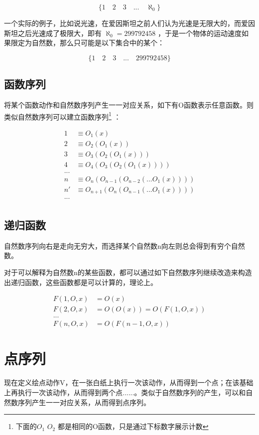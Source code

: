 \documentclass[12pt,oneside]{book}
\begin{document}
\[
\{1 \quad 2 \quad 3 \quad  ...  \quad \aleph_0\}
\]

一个实际的例子，比如说光速，在爱因斯坦之前人们认为光速是无限大的，而爱因斯坦之后光速成了极限大，即有 $\aleph_0=299792458$ ，于是一个物体的运动速度如果限定为自然数，那么只可能是以下集合中的某个：

\[
\{1 \quad 2 \quad 3 \quad  ...  \quad 299792458\}
\]

\subsection{函数序列}
将某个函数动作和自然数序列产生一一对应关系，如下有O函数表示任意函数。则类似自然数序列可以建立函数序列\footnote{下面的$O_1$ $O_2$ 都是相同的O函数，只是通过下标数字展示计数} ：

\begin{align*}
1 &\equiv O_1(x) \\
2 &\equiv O_2(O_1(x)) \\
3 &\equiv O_3(O_2(O_1(x))) \\
4 &\equiv O_4(O_3(O_2(O_1(x)))) \\
...\\
n &\equiv O_n(O_{n-1}(O_{n-2}(...O_1(x)))) \\
n' &\equiv O_{n+1}(O_n(O_{n-1}(...O_1(x))))\\
...\\
\end{align*}



\subsection{递归函数}
自然数序列向右是走向无穷大，而选择某个自然数n向左则总会得到有穷个自然数。

对于可以解释为自然数n的某些函数，都可以通过如下自然数序列继续改造来构造出递归函数，这些函数都是可以计算的，理论上。

\begin{align*}
F(1, O, x) &= O(x)\\
F(2, O, x) &= O(O(x)) = O(F(1, O, x))\\
...\\
F(n, O, x) &= O(F(n-1, O, x))
\end{align*}




\section{点序列}
现在定义绘点动作V，在一张白纸上执行一次该动作，从而得到一个点；在该基础上再执行一次该动作，从而得到两个点......。类似于自然数序列的产生，可以和自然数序列产生一一对应关系，从而得到点序列。
\end{document}
